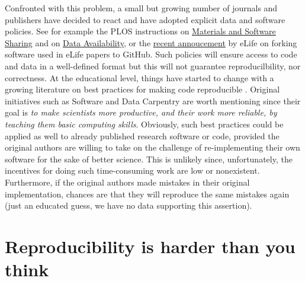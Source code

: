 \documentclass[a4paper,10pt, twocolumn]{article}
\begin{document}
Confronted with this problem, a small but growing number of journals and
publishers have decided to react and have adopted explicit data and software
policies. See for example the PLOS instructions on
\href{http://journals.plos.org/plosone/s/materials-and-software-sharing}{Materials
  and Software Sharing} and
on \href{http://journals.plos.org/plosone/s/data-availability}{Data Availability},
or the
\href{https://elifesciences.org/elife-news/inside-elife-forking-software-used-elife-papers-github}{recent
  annoucement} by eLife on forking software used in eLife papers to GitHub.
Such policies will ensure access to code and data in a well-defined format
\citep{perkel:2016} but this will not guarantee reproducilbility, nor
correctness. At the educational level, things have started to change with a
growing literature on best practices for making code reproducible
\citep{sandve:2013, crook:2013, wilson:2014, halchenko:2015, janz:2015,
  hinsen:2015}. Original initiatives such as Software and Data Carpentry
\citep{wilson:2016} are worth mentioning since their goal is {\em to make
  scientists more productive, and their work more reliable, by teaching them
  basic computing skills}. Obviously, such best practices could be applied as well to already published research software or code, provided the original
authors are willing to take on the challenge of re-implementing their own
software for the sake of better science. This is unlikely since, unfortunately, the
incentives for doing such time-consuming work are low or nonexistent.
Furthermore, if the original authors made mistakes in their original
implementation, chances are that they will reproduce the same mistakes again (just an educated guess, we have no data supporting this
assertion).\\



\section*{Reproducibility is harder than you think}
\end{document}
